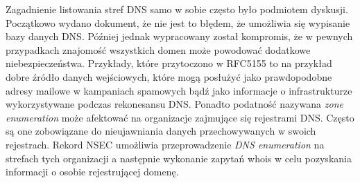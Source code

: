 Zagadnienie listowania stref DNS samo w sobie często było podmiotem dyskusji. Początkowo wydano dokument, że nie jest to błędem,
że umożliwia się wypisanie bazy danych DNS\cite{RFC4033}. Później jednak wypracowany został kompromis\cite{RFC5155}, że w pewnych
przypadkach znajomość wszystkich domen może powodować dodatkowe niebezpieczeństwa. Przykłady, które przytoczono w RFC5155\cite{RFC5155}
to na przykład dobre źródło danych wejściowych, które mogą posłużyć jako prawdopodobne adresy mailowe w kampaniach spamowych bądź
jako informacje o infrastrukturze wykorzystywane podczas rekonesansu DNS. Ponadto podatność nazywana \textit{zone enumeration}
może afektować na organizacje zajmujące się rejestrami DNS. Często są one zobowiązane do nieujawniania danych przechowywanych w
swoich rejestrach. Rekord NSEC umożliwia przeprowadzenie \textit{DNS enumeration} na strefach tych organizacji a następnie wykonanie
zapytań whois\cite{RFC3912} w celu pozyskania informacji o osobie rejestrującej domenę.

